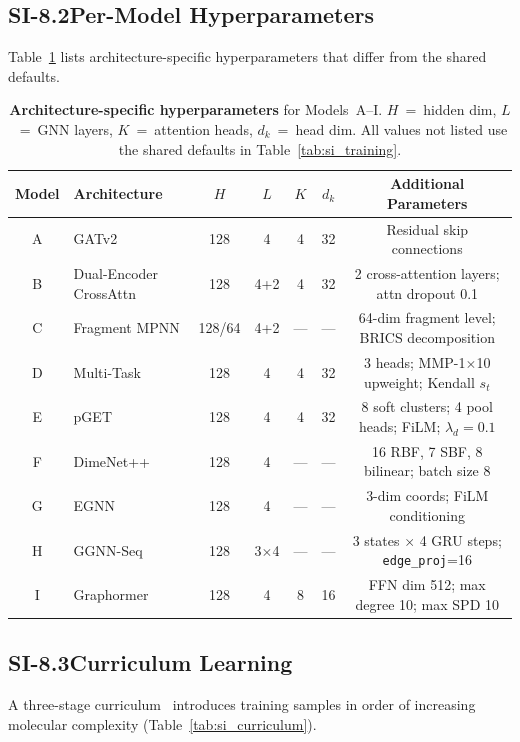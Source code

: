 \documentclass[11pt]{article}
\begin{document}
\subsection*{SI-8.2\quad Per-Model Hyperparameters}

Table~\ref{tab:si_model_hyper} lists architecture-specific hyperparameters
that differ from the shared defaults.

\begin{table}[H]
\small
\centering
\caption{\textbf{Architecture-specific hyperparameters} for Models~A--I.
  $H$~=~hidden dim, $L$~=~GNN layers, $K$~=~attention heads,
  $d_k$~=~head dim.
  All values not listed use the shared defaults in Table~\ref{tab:si_training}.}
\label{tab:si_model_hyper}
\begin{tabular}{clccccc}
\toprule
\textbf{Model} & \textbf{Architecture} & $H$ & $L$ & $K$ & $d_k$
  & \textbf{Additional Parameters} \\
\midrule
A & GATv2 & 128 & 4 & 4 & 32 & Residual skip connections \\
B & Dual-Encoder CrossAttn & 128 & 4+2 & 4 & 32
  & 2 cross-attention layers; attn dropout 0.1 \\
C & Fragment MPNN & 128/64 & 4+2 & --- & ---
  & 64-dim fragment level; BRICS decomposition \\
D & Multi-Task & 128 & 4 & 4 & 32
  & 3 heads; MMP-1$\times$10 upweight; Kendall $s_t$ \\
E & pGET & 128 & 4 & 4 & 32
  & 8 soft clusters; 4 pool heads; FiLM; $\lambda_d{=}0.1$ \\
F & DimeNet++ & 128 & 4 & --- & ---
  & 16 RBF, 7 SBF, 8 bilinear; batch size 8 \\
G & EGNN & 128 & 4 & --- & ---
  & 3-dim coords; FiLM conditioning \\
H & GGNN-Seq & 128 & 3$\times$4 & --- & ---
  & 3 states $\times$ 4 GRU steps; \texttt{edge\_proj}=16 \\
I & Graphormer & 128 & 4 & 8 & 16
  & FFN dim 512; max degree 10; max SPD 10 \\
\bottomrule
\end{tabular}
\end{table}

\subsection*{SI-8.3\quad Curriculum Learning}

A three-stage curriculum~\cite{bengio2009curriculum} introduces training
samples in order of increasing molecular complexity
(Table~\ref{tab:si_curriculum}).
\end{document}
